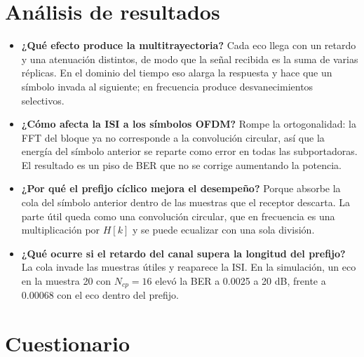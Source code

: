 \documentclass[11pt,a4paper]{article}
\begin{document}
\section{Análisis de resultados}

\begin{itemize}
  \item \textbf{¿Qué efecto produce la multitrayectoria?} Cada eco llega con un retardo y
        una atenuación distintos, de modo que la señal recibida es la suma de varias
        réplicas. En el dominio del tiempo eso alarga la respuesta y hace que un símbolo
        invada al siguiente; en frecuencia produce desvanecimientos selectivos.
  \item \textbf{¿Cómo afecta la ISI a los símbolos OFDM?} Rompe la ortogonalidad: la FFT
        del bloque ya no corresponde a la convolución circular, así que la energía del
        símbolo anterior se reparte como error en todas las subportadoras. El resultado es
        un piso de BER que no se corrige aumentando la potencia.
  \item \textbf{¿Por qué el prefijo cíclico mejora el desempeño?} Porque absorbe la cola
        del símbolo anterior dentro de las muestras que el receptor descarta. La parte útil
        queda como una convolución circular, que en frecuencia es una multiplicación por
        $H[k]$ y se puede ecualizar con una sola división.
  \item \textbf{¿Qué ocurre si el retardo del canal supera la longitud del prefijo?} La
        cola invade las muestras útiles y reaparece la ISI. En la simulación, un eco en la
        muestra 20 con $N_{cp}=16$ elevó la BER a 0.0025 a 20 dB, frente a 0.00068 con el
        eco dentro del prefijo.
\end{itemize}

\section{Cuestionario}
\end{document}
